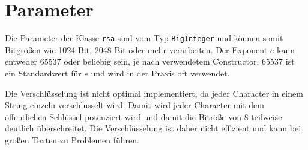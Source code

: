 \section{Parameter}
Die Parameter der Klasse \texttt{\gls{rsa}} sind vom Typ \texttt{BigInteger} und können somit Bitgrößen wie 1024 Bit, 2048 Bit oder mehr verarbeiten. Der Exponent $e$ kann entweder 65537 oder beliebig sein, je nach verwendetem Constructor. 65537 ist ein Standardwert für $e$ und wird in der Praxis oft verwendet.

Die Verschlüsselung ist nicht optimal implementiert, da jeder Character in einem String einzeln verschlüsselt wird. Damit wird jeder Character mit dem öffentlichen Schlüssel potenziert wird und damit die Bitröße von 8 teilweise deutlich überschreitet. Die Verschlüsselung ist daher nicht effizient und kann bei großen Texten zu Problemen führen.